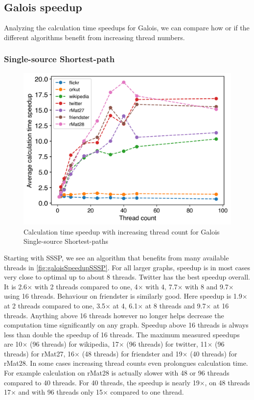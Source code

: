 



\subsection{Galois speedup}
\label{sec:galois_speedup}
Analyzing the calculation time speedups for Galois, we can compare how or if the different algorithms benefit from increasing thread numbers.

\subsubsection{Single-source Shortest-path}
\begin{figure}
	\includegraphics[width=\linewidth]{../../plots/singleNodeSSSPGaloisThreads.png}
	\caption{Calculation time speedup with increasing thread count for Galois Single-source Shortest-paths}
	\label{fig:galoisSpeedupSSSP}
\end{figure}
Starting with SSSP, we see an algorithm that benefits from many available threads in \autoref{fig:galoisSpeedupSSSP}.
For all larger graphs, speedup is in most cases very close to optimal up to about 8 threads.
Twitter has the best speedup overall. It is 2.6$\times$ with 2 threads compared to one, 4$\times$ with 4, 7.7$\times$ with 8 and 9.7$\times$ using 16 threads.
Behaviour on friendster is similarly good. Here speedup is 1.9$\times$ at 2 threads compared to one, 3.5$\times$ at 4, 6.1$\times$ at 8 threads and 9.7$\times$ at 16 threads.
Anything above 16 threads however no longer helps decrease the computation time significantly on any graph. Speedup above 16 threads is always less than double the speedup of 16 threads. The maximum measured speedups are 10$\times$ (96 threads) for wikipedia, 17$\times$ (96 threads) for twitter, 11$\times$ (96 threads) for rMat27, 16$\times$ (48 threads) for friendster and 19$\times$ (40 threads) for rMat28.
In some cases increasing thread counts even prolongues calculation time. For example calculation on rMat28 is actually slower with 48 or 96 threads compared to 40 threads. For 40 threads, the speedup is nearly 19$\times$, on 48 threads 17$\times$ and with 96 threads only 15$\times$ compared to one thread.

